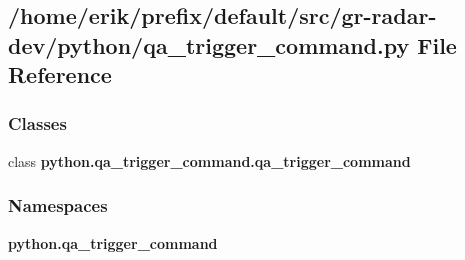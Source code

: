 \subsection{/home/erik/prefix/default/src/gr-\/radar-\/dev/python/qa\+\_\+trigger\+\_\+command.py File Reference}
\label{qa__trigger__command_8py}
\subsubsection*{Classes}
\begin{DoxyCompactItemize}
\item 
class {\bf python.\+qa\+\_\+trigger\+\_\+command.\+qa\+\_\+trigger\+\_\+command}
\end{DoxyCompactItemize}
\subsubsection*{Namespaces}
\begin{DoxyCompactItemize}
\item 
 {\bf python.\+qa\+\_\+trigger\+\_\+command}
\end{DoxyCompactItemize}
